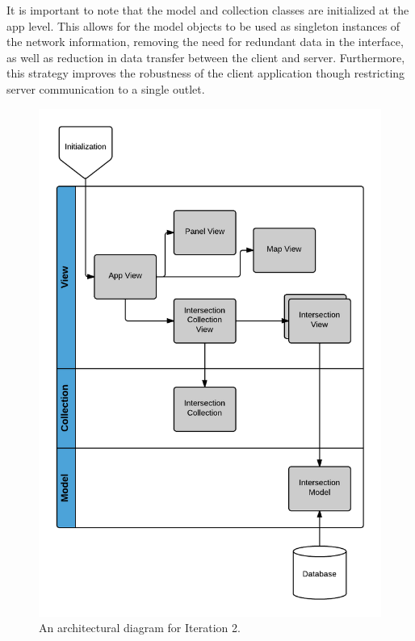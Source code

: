 \documentclass{report}
\begin{document}
It is important to note that the model and collection classes are initialized at the app level. This allows for the model objects to be used as singleton instances of the network information, removing the need for redundant data in the interface, as well as reduction in data transfer between the client and server. Furthermore, this strategy improves the robustness of the client application though restricting server communication to a single outlet.

\begin{figure}[htbp!]
  \begin{centering}
    \includegraphics[scale=0.25]{figures/Iteration-2.png}
    \caption{An architectural diagram for Iteration 2.}
    \label{fig:iteration2}
  \end{centering}
\end{figure}
\end{document}

